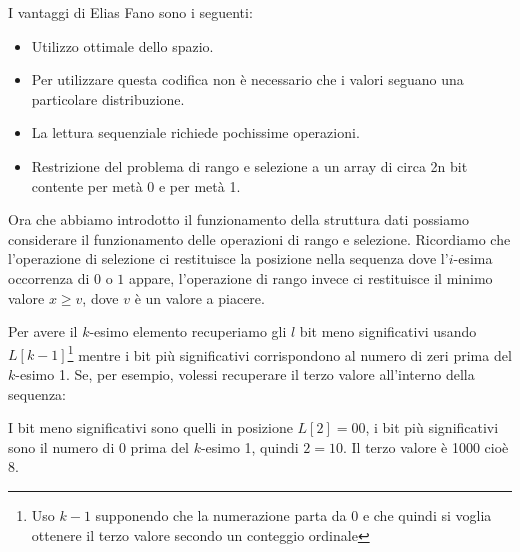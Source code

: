 I vantaggi di Elias Fano sono i seguenti:
\begin{itemize}
	\item Utilizzo ottimale dello spazio.
	\item Per utilizzare questa codifica non è necessario che i valori seguano una particolare distribuzione.
	\item La lettura sequenziale richiede pochissime operazioni.
	\item Restrizione del problema di rango e selezione a un array di circa 2n bit contente per metà 0 e per metà 1.
\end{itemize}
Ora che abbiamo introdotto il funzionamento della struttura dati possiamo considerare il funzionamento delle operazioni di rango e selezione. Ricordiamo che l'operazione di selezione ci restituisce la posizione nella sequenza dove l'$i$-esima occorrenza di $0$ o $1$ appare, l'operazione di rango invece ci restituisce il minimo valore $x \geq v$, dove $v$ è un valore a piacere.

Per avere il $k$-esimo elemento recuperiamo gli $l$ bit meno significativi usando $L[k - 1]$\footnote{Uso $k - 1$ supponendo che la numerazione parta da 0 e che quindi si voglia ottenere il terzo valore secondo un conteggio ordinale} mentre i bit più significativi corrispondono al numero di zeri prima del $k$-esimo 1. Se, per esempio, volessi recuperare il terzo valore all'interno della sequenza:

I bit meno significativi sono quelli in posizione $L[2] = 00$, i bit più significativi sono il numero di 0 prima del $k$-esimo 1, quindi $2 = 10$. Il terzo valore è 1000 cioè $8$.

